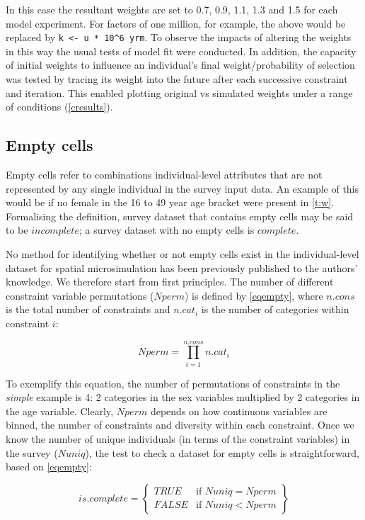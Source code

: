 \documentclass[a4paper,10pt]{article}
\begin{document}
In this case the resultant weights are set to
 0.7, 0.9, 1.1, 1.3 and 1.5 for each model experiment. 
For factors of one million, for example, 
the above would be replaced by \lstinline !k <- u * 10^6 yrm!. 
To observe the impacts of altering the weights in this way
the usual tests of model fit were conducted. In addition,
the capacity of initial weights to influence an individual's 
final weight/probability of selection was tested by tracing its
weight into the future after each successive constraint and iteration. 
This enabled plotting original vs simulated weights under a 
range of conditions (\cref{cresults}).

\subsection{Empty cells} \label{smempty}
Empty cells refer to combinations individual-level 
attributes that are not represented by any single individual 
in the survey input data. An example of this would be if no female 
in the 16 to 49 year age bracket were present in \cref{t:w}.
Formalising the definition,
survey dataset that contains empty cells may be said to be $incomplete$;
a survey dataset with no empty cells is $complete$.

No method for identifying whether or not empty cells exist in the
individual-level dataset for spatial microsimulation has been previously published
to the authors' knowledge. We therefore start from first principles.
The number of different constraint variable permutations ($Nperm$) is defined by \cref{eqempty},
where $n.cons$ is the total number of constraints and $n.cat_i$ is the number of categories
within constraint $i$:

\begin{equation}
\displaystyle Nperm = \prod_{i = 1}^{n.cons} n.cat_{i} 
\label{eqempty}
\end{equation}

To exemplify this equation, the number of permutations of constraints in the
\emph{simple} example is 4: 2 categories in the sex variables multiplied by
2 categories in the age variable. Clearly, $Nperm$ depends on how continuous variables
are binned, the number of constraints and diversity within each constraint.
Once we know the number of unique individuals (in terms of the constraint variables)
in the survey ($Nuniq$), the test to check a dataset for empty cells is straightforward,
based on \cref{eqempty}:

\begin{equation}
is.complete =
\left\{
	\begin{array}{ll}
		TRUE  & \mbox{if } Nuniq = Nperm \\
		FALSE & \mbox{if } Nuniq < Nperm
	\end{array}
\right\}
\end{equation}
\end{document}
